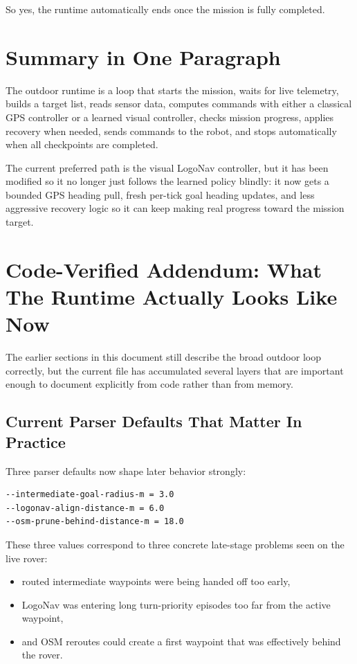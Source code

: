 \documentclass[11pt]{article}
\begin{document}
So yes, the runtime automatically ends once the mission is fully completed.

\section*{Summary in One Paragraph}
The outdoor runtime is a loop that starts the mission, waits for live telemetry, builds a target list, reads sensor data, computes commands with either a classical GPS controller or a learned visual controller, checks mission progress, applies recovery when needed, sends commands to the robot, and stops automatically when all checkpoints are completed.

The current preferred path is the visual LogoNav controller, but it has been modified so it no longer just follows the learned policy blindly: it now gets a bounded GPS heading pull, fresh per-tick goal heading updates, and less aggressive recovery logic so it can keep making real progress toward the mission target.


\section*{Code-Verified Addendum: What The Runtime Actually Looks Like Now}
The earlier sections in this document still describe the broad outdoor loop correctly, but the current file has accumulated several layers that are important enough to document explicitly from code rather than from memory.

\subsection*{Current Parser Defaults That Matter In Practice}
Three parser defaults now shape later behavior strongly:
\begin{verbatim}
--intermediate-goal-radius-m = 3.0
--logonav-align-distance-m = 6.0
--osm-prune-behind-distance-m = 18.0
\end{verbatim}

These three values correspond to three concrete late-stage problems seen on the live rover:
\begin{itemize}[leftmargin=*]
\item routed intermediate waypoints were being handed off too early,
\item LogoNav was entering long turn-priority episodes too far from the active waypoint,
\item and OSM reroutes could create a first waypoint that was effectively behind the rover.
\end{itemize}
\end{document}
